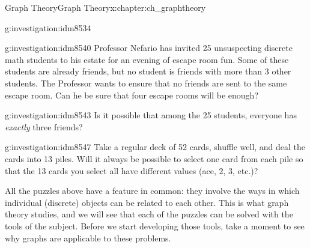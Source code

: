\documentclass[oneside,10pt,]{book}
\numberwithin{equation}{chapter}
\begin{document}
\begin{chapterptx}{Graph Theory}{}{Graph Theory}{}{}{x:chapter:ch_graphtheory}
\begin{introduction}{}
\begin{investigation}{}{g:investigation:idm8534}
\begin{sidebyside}{1}{0}{0}{0}
\begin{sbspanel}{1}
{
}%
\end{sbspanel}%
\end{sidebyside}%
\end{investigation}
\begin{investigation}{}{g:investigation:idm8540}%
Professor Nefario has invited 25 unsuspecting discrete math students to his estate for an evening of escape room fun.  Some of these students are already friends, but no student is friends with more than 3 other students.  The Professor wants to ensure that no friends are sent to the same escape room.  Can he be sure that four escape rooms will be enough?%
\end{investigation}
\begin{investigation}{}{g:investigation:idm8543}%
Is it possible that among the 25 students, everyone has \emph{exactly} three friends?%
\end{investigation}
\begin{investigation}{}{g:investigation:idm8547}%
Take a regular deck of 52 cards, shuffle well, and deal the cards into 13 piles.  Will it always be possible to select one card from each pile so that the 13 cards you select all have different values (ace, 2, 3, etc.)?%
\end{investigation}
All the puzzles above have a feature in common: they involve the ways in which individual (discrete) objects can be related to each other.  This is what graph theory studies, and we will see that each of the puzzles can be solved with the tools of the subject.  Before we start developing those tools, take a moment to see why graphs are applicable to these problems.%

\end{introduction}
\end{chapterptx}
\end{document}
